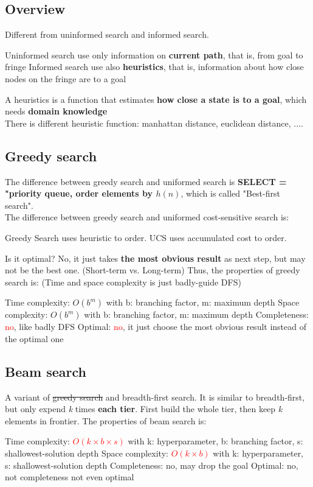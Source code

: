 \subsection{Overview}
Different from uninformed search and informed search. 
\begin{outline}
    \1 Uninformed search
        \2 use only information on \textbf{current path}, that is, from goal to fringe
    \1 Informed search
        \2 use also \textbf{heuristics}, that is, information about how close nodes on the fringe are to a goal
\end{outline}

\noindent
A heuristics is a function that estimates \textbf{how close a state is to a goal}, which needs \textbf{domain knowledge} \\

There is different heuristic function: manhattan distance, euclidean distance, ....

\subsection{Greedy search}
The difference between greedy search and uniformed search is \textbf{SELECT = "priority queue, order elements by $h(n)$}, which is called "Best-first search". \\
The difference between greedy search and uniformed cost-sensitive search is:
\begin{outline}
    \1 Greedy Search uses heuristic to order.
    \1 UCS uses accumulated cost to order.
\end{outline}

\noindent
Is it optimal? No, it just takes \textbf{the most obvious result} as next step, but may not be the best one. (Short-term vs. Long-term) Thus, the properties of greedy search is: (Time and space complexity is just badly-guide DFS)
\begin{outline}
    \1 Time complexity: $O(b^{m})$
        \2 with b: branching factor, m: maximum depth
    \1 Space complexity: $O(b^{m})$
        \2 with b: branching factor, m: maximum depth
    \1 Completeness: \textcolor{red}{no}, like badly DFS
    \1 Optimal: \textcolor{red}{no}, it just choose the most obvious result instead of the optimal one
\end{outline}

\subsection{Beam search}
A variant of \st{greedy search} and breadth-first search. It is similar to breadth-first, but only expend \emph{k} times \textbf{each tier}. First build the whole tier, then keep \emph{k} elements in frontier. The properties of beam search is:
\begin{outline}
    \1 Time complexity: \textcolor{red}{$O(k \times b \times s)$}
        \2 with k: hyperparameter, b: branching factor, s: shallowest-solution depth
    \1 Space complexity: \textcolor{red}{$O(k \times b)$}
        \2 with k: hyperparameter, s: shallowest-solution depth
    \1 Completeness: no, may drop the goal
    \1 Optimal: no, not completeness not even optimal
\end{outline}

